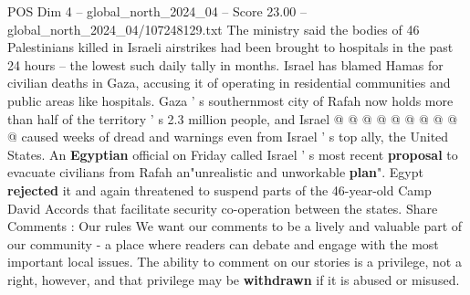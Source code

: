 \begin{textsample}{POS Dim 4 – global\_north\_2024\_04 – Score 23.00 – global\_north\_2024\_04/107248129.txt}
The ministry said the bodies of 46 Palestinians killed in Israeli airstrikes had been brought to hospitals in the past 24 hours -- the lowest such daily tally in months.
Israel has blamed Hamas for civilian deaths in Gaza, accusing it of operating in residential communities and public areas like hospitals.
Gaza ' s southernmost city of Rafah now holds more than half of the territory ' s 2.3 million people, and Israel @ @ @ @ @ @ @ @ @ @ caused weeks of dread and warnings even from Israel ' s top ally, the United States.
An \textbf{Egyptian} official on Friday called Israel ' s most recent \textbf{proposal} to evacuate civilians from Rafah an"unrealistic and unworkable \textbf{plan}".
Egypt \textbf{rejected} it and again threatened to suspend parts of the 46-year-old Camp David Accords that facilitate security co-operation between the states.
Share Comments : Our rules We want our comments to be a lively and valuable part of our community - a place where readers can debate and engage with the most important local issues.
The ability to comment on our stories is a privilege, not a right, however, and that privilege may be \textbf{withdrawn} if it is abused or misused.

\end{textsample}
